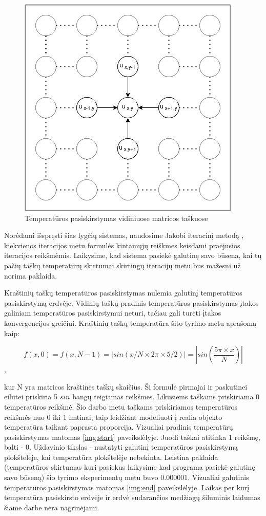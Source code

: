 \documentclass{VUMIFPSbakalaurinis}
\begin{document}
\begin{figure}[H]
    \centering
    \includegraphics[scale=0.7]{img/5point.png}
    \caption{Temperatūros pasiskirstymas vidiniuose matricos taškuose}
    \label{img:5point}
\end{figure}

Norėdami išspręsti šias lygčių sistemas, naudosime Jakobi iteracinį metodą \cite{burden2011numerical}, kiekvienos iteracijos metu formulės kintamųjų reiškmes keisdami praėjusios iteracijos reikšmėmis.
Laikysime, kad sistema pasiekė galutinę savo būsena, kai tų pačių taškų temperatūrų skirtumai skirtingų iteracijų metu bus mažesni už norima paklaida.

Kraštinių taškų temperatūros pasiskirstymas nulemia galutinį temperatūros pasiskirstymą erdvėje.
Vidinių taškų pradinis temperatūros pasiskirstymas įtakos galiniam temperatūros pasiskirstymui neturi, tačiau gali turėti įtakos konvergencijos greičiui.
Kraštinių taškų temperatūra šito tyrimo metu aprašomą kaip:

\[ f(x, 0) = f(x, N-1) = |sin(x/N \times 2\pi \times 5/2)| = |sin(\frac{5\pi \times x}{N})| \], 

kur N yra matricos kraštinės taškų skaičius.
Ši formulė pirmajai ir paskutinei eilutei priskiria 5 $sin$ bangų teigiamas reikšmes.
Likusiems taškams priskiriama 0 temperatūros reikšmė.
Šio darbo metu taškams priskiriamos temperatūros reikšmės nuo 0 iki 1 imtinai, taip leidžiant modeliuoti į realia objekto temperatūra taikant paprasta proporcija.
Vizualiai pradinis temperatūrų pasiskirstymas matomas \ref{img:start} paveikslėlyje.
Juodi taškai atitinka 1 reikšmę, balti - 0.
Uždavinio tikslas - nustatyti galutinį temperatūros pasiskirstymą plokštelėje, kai temperatūra plokštelėje nebekinta.
Leistina paklaida (temperatūros skirtumas kuri pasiekus laikysime kad programa pasiekė galutinę savo būseną) šio tyrimo eksperimentų metu buvo 0.000001.  
Vizualiai galutinis temperatūros pasiskirstymas matomas \ref{img:end} paveikslėlyje.
Laikas per kurį temperatūra pasiskirsto erdvėje ir erdvė sudarančios medžiagų šiluminis laidumas šiame darbe nėra nagrinėjami. 
\end{document}
